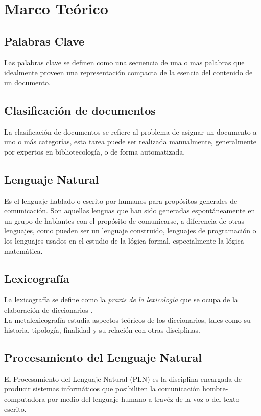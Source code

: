 \chapter{Marco Te\'orico}
\section{Palabras Clave}
Las palabras clave se definen como una secuencia de una o mas palabras que idealmente
proveen una representaci\'on compacta de la esencia del contenido de un 
documento. \cite{REC10}

\section {Clasificaci\'on de documentos}
La clasificaci\'on de documentos se refiere al problema de asignar un documento a
uno o m\'as categor\'ias, esta tarea puede ser realizada manualmente, generalmente
por expertos en bibliotecolog\'ia, o de forma automatizada.

\section{Lenguaje Natural}
Es el lenguaje hablado o escrito por humanos para prop\'ositos generales
de comunicaci\'on. Son aquellas lenguas que han sido generadas
espont\'aneamente en un grupo de hablantes con el prop\'osito de
comunicarse, a diferencia de otras lenguajes, como pueden ser un lenguaje
construido, lenguajes de programaci\'on o los lenguajes usados en el
estudio de la l\'ogica formal, especialmente la l\'ogica matem\'atica.

\section{Lexicograf\'ia}
La lexicograf\'ia se define como la \emph{praxis de la lexicolog\'ia} que se ocupa
de la elaboraci\'on de diccionarios \cite{LEX01}. \\

La metalexicograf\'ia estudia aspectos te\'oricos de los diccionarios, tales como
su historia, tipolog\'ia, finalidad y su relaci\'on con otras disciplinas. \\

\section{Procesamiento del Lenguaje Natural}
El Procesamiento del Lenguaje Natural (PLN) es la disciplina encargada
de producir sistemas inform\'aticos que posibiliten la comunicaci\'on
hombre-computadora por medio del lenguaje humano a trav\'ez de la voz o
del texto escrito.

